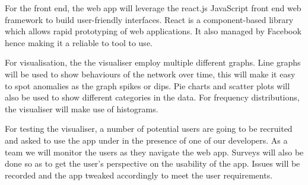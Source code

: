 For the front end, the web app will leverage the react.js JavaScript front end web framework to build user-friendly interfaces. React is a component-based library which allows rapid prototyping of web applications. It also managed by Facebook hence making it a reliable to tool to use.

For visualisation, the the visualiser employ multiple different graphs. Line graphs will be used to show behaviours of the network over time, this will make it easy to spot anomalies as the graph spikes or dips. Pie charts and scatter plots will also be used to show different categories in the data. For frequency distributions, the visualiser will make use of histograms.

For testing the visualiser, a number of potential users are going to be recruited and asked to use the app under in the presence of one of our developers. As a team we will monitor the users as they navigate the web app. Surveys will also be done so as to get the user’s perspective on the usability of the app. Issues will be recorded and the app tweaked accordingly to meet the user requirements.

